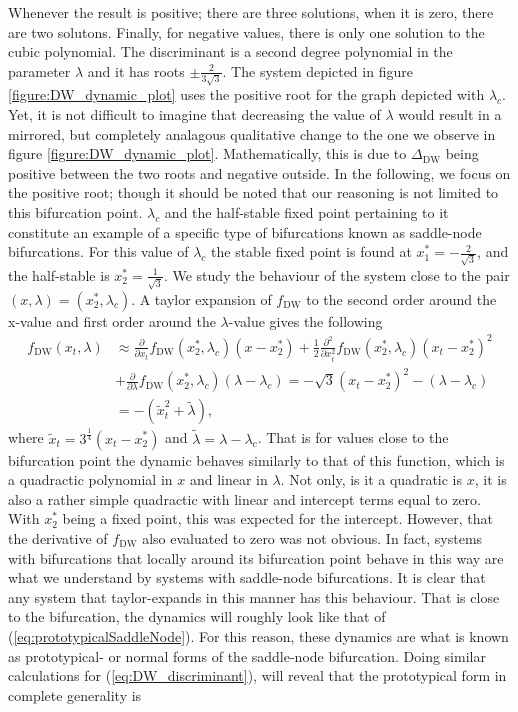 Whenever the result is positive; there are three solutions, when it is zero, there are two solutons. Finally, for negative values, there is only one solution to the cubic polynomial. The discriminant is a second degree polynomial in the parameter $\lambda$ and it has roots $\pm \frac{2}{3\sqrt{3}}$. The system depicted in figure \ref{figure:DW_dynamic_plot} uses the positive root for the graph depicted with $\lambda_c$. Yet, it is not difficult to imagine that decreasing the value of $\lambda$ would result in a mirrored, but completely analagous qualitative change to the one we observe in figure \ref{figure:DW_dynamic_plot}. Mathematically, this is due to $\Delta_{\mathrm{DW}}$ being positive between the two roots and negative outside. In the following, we focus on the positive root; though it should be noted that our reasoning is not limited to this bifurcation point. $\lambda_c$ and the half-stable fixed point pertaining to it constitute an example of a specific type of bifurcations known as saddle-node bifurcations. For this value of $\lambda_c$ the stable fixed point is found at $x_1^* = -\frac{2}{\sqrt{3}}$, and the half-stable is $x_2^* = \frac{1}{\sqrt{3}}$. We study the behaviour of the system close to the pair $(x, \lambda) = (x_2^*, \lambda_c)$. A taylor expansion of $f_{\mathrm{DW}}$ to the second order around the x-value and first order around the $\lambda$-value gives the following
\begin{align}
    f_{\mathrm{DW}}(x_t,\lambda)&\approx \frac{\partial}{\partial x_t}f_{\mathrm{DW}}(x_2^*,\lambda_c)(x-x_2^*) + \frac{1}{2}\frac{\partial^2}{\partial x_t^2}f_{\mathrm{DW}}(x_2^*,\lambda_c)(x_t-x_2^*)^2 \nonumber \\
     &+ \frac{\partial}{\partial \lambda}f_{\mathrm{DW}}(x_2^*,\lambda_c)(\lambda - \lambda_c) = -\sqrt{3}\left(x_t-x_2^*\right)^2 - \left(\lambda - \lambda_c\right) \nonumber \\&= -\left(\tilde{x}_t^2 + \tilde{\lambda}\right), \label{eq:prototypicalSaddleNode}
\end{align}
where $\tilde{x}_t = 3^{\frac{1}{4}}\left(x_t-x_2^*\right)$ and  $\tilde{\lambda} = \lambda - \lambda_c$. That is for values close to the bifurcation point the dynamic behaves similarly to that of this function, which is a quadractic polynomial in $x$ and linear in $\lambda$. Not only, is it a quadratic is $x$, it is also a rather simple quadractic with linear and intercept terms equal to zero. With $x_2^*$ being a fixed point, this was expected for the intercept. However, that the derivative of $f_{\mathrm{DW}}$ also evaluated to zero was not obvious. In fact, systems with bifurcations that locally around its bifurcation point behave in this way are what we understand by systems with saddle-node bifurcations. It is clear that any system that taylor-expands in this manner has this behaviour. That is close to the bifurcation, the dynamics will roughly look like that of (\ref{eq:prototypicalSaddleNode}). For this reason, these dynamics are what is known as prototypical- or normal forms of the saddle-node bifurcation. Doing similar calculations for (\ref{eq:DW_discriminant}), will reveal that the prototypical form in complete generality is
